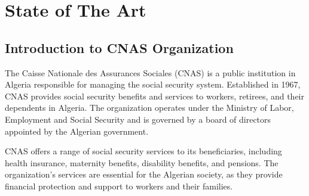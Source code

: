 \chapter{State of The Art}
\section{Introduction to CNAS Organization}

The Caisse Nationale des Assurances Sociales (CNAS) is a public institution in Algeria responsible for managing the social security system. Established in 1967, CNAS provides social security benefits and services to workers, retirees, and their dependents in Algeria. The organization operates under the Ministry of Labor, Employment and Social Security and is governed by a board of directors appointed by the Algerian government.

CNAS offers a range of social security services to its beneficiaries, including health insurance, maternity benefits, disability benefits, and pensions. The organization's services are essential for the Algerian society, as they provide financial protection and support to workers and their families.


